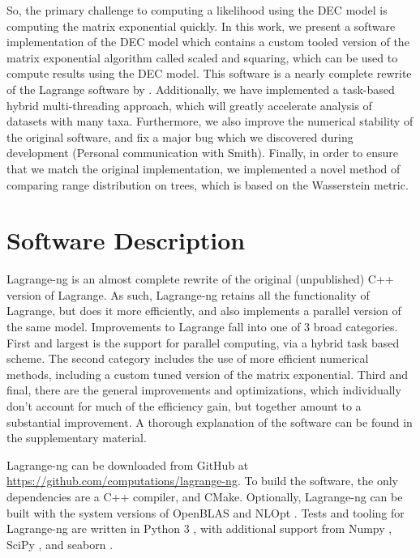 \documentclass[oupdraft]{sysbio}
\begin{document}
So, the primary challenge to computing a likelihood using the DEC model is computing the matrix exponential quickly. In
this work, we present a software implementation of the DEC model which contains a custom tooled version of the matrix
exponential algorithm called scaled and squaring, which can be used to compute results using the DEC model. This
software is a nearly complete rewrite of the Lagrange software by \citet{ree_likelihood_2005}. Additionally, we have
implemented a task-based hybrid multi-threading approach, which will greatly accelerate analysis of datasets with many
taxa. Furthermore, we also improve the numerical stability of the original software, and fix a major bug which we
discovered during development (Personal communication with Smith). Finally, in order to ensure that we match the
original implementation, we implemented a novel method of comparing range distribution on trees, which is based on the
Wasserstein metric.

\bigskip
\section{Software Description}\label{sec:description}

Lagrange-ng is an almost complete rewrite of the original (unpublished) C++ version of Lagrange. As such, Lagrange-ng
retains all the functionality of Lagrange, but does it more efficiently, and also implements a parallel version of the
same model. Improvements to Lagrange fall into one of 3 broad categories. First and largest is the support for parallel
computing, via a hybrid task based scheme. The second category includes the use of more efficient numerical methods,
including a custom tuned version of the matrix exponential. Third and final, there are the general improvements and
optimizations, which individually don't account for much of the efficiency gain, but together amount to a substantial
improvement. A thorough explanation of the software can be found in the supplementary material.

Lagrange-ng can be downloaded from GitHub at \url{https://github.com/computations/lagrange-ng}. To build the software,
the only dependencies are a C++ compiler, and CMake. Optionally, Lagrange-ng can be built with the system versions of
OpenBLAS \citep{openblas} and NLOpt \citep{nelder_simplex_1965, johnson_stevengjnlopt_2021}. Tests and tooling for
Lagrange-ng are written in Python 3 \citep{python3}, with additional support from Numpy \citep{numpy}, SciPy
\citep{scipy}, and seaborn \citep{Waskom2021}.
\end{document}
